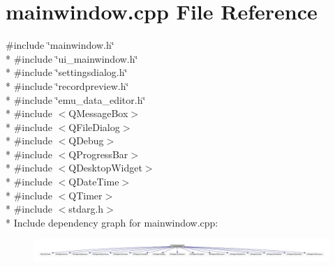 \hypertarget{a00109}{\section{mainwindow.\+cpp File Reference}
\label{a00109}
}
{\ttfamily \#include \char`\"{}mainwindow.\+h\char`\"{}}\\*
{\ttfamily \#include \char`\"{}ui\+\_\+mainwindow.\+h\char`\"{}}\\*
{\ttfamily \#include \char`\"{}settingsdialog.\+h\char`\"{}}\\*
{\ttfamily \#include \char`\"{}recordpreview.\+h\char`\"{}}\\*
{\ttfamily \#include \char`\"{}emu\+\_\+data\+\_\+editor.\+h\char`\"{}}\\*
{\ttfamily \#include $<$Q\+Message\+Box$>$}\\*
{\ttfamily \#include $<$Q\+File\+Dialog$>$}\\*
{\ttfamily \#include $<$Q\+Debug$>$}\\*
{\ttfamily \#include $<$Q\+Progress\+Bar$>$}\\*
{\ttfamily \#include $<$Q\+Desktop\+Widget$>$}\\*
{\ttfamily \#include $<$Q\+Date\+Time$>$}\\*
{\ttfamily \#include $<$Q\+Timer$>$}\\*
{\ttfamily \#include $<$stdarg.\+h$>$}\\*
Include dependency graph for mainwindow.\+cpp\+:
\nopagebreak
\begin{figure}[H]
\begin{center}
\leavevmode
\includegraphics[width=350pt]{d2/d82/a00279}
\end{center}
\end{figure}
